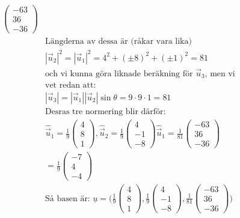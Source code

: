 \begin{multicols}{2}
\begin{align*}
  \begin{pmatrix} -63 \\ 36 \\ -36 \end{pmatrix} \\
  &\text{Längderna av dessa är (råkar vara lika)}  \\
  &|\vec{u}_2|^2 = |\vec{u}_1|^2 = 4^2 + {(\pm{8})}^2 + {(\pm{1})}^2 = 81 \\
  &\text{och vi kunna göra liknade beräkning för } \vec{u}_3 \text{, men vi} \\
  &\text{vet redan att:} \\
  &|\vec{u}_3| = |\vec{u}_1||\vec{u}_2|\sin{\theta}=9\cdot{}9\cdot{}1=81 \\
  &\text{Desras tre normering blir därför:} \\
  &\hat\vec{u}_1 = \frac{1}{9}\begin{pmatrix} 4 \\ 8 \\ 1 \end{pmatrix},
  \hat\vec{u}_2 = \frac{1}{9}\begin{pmatrix} 4 \\ -1 \\ -8 \end{pmatrix}
  \hat\vec{u}_1 = \frac{1}{81}\begin{pmatrix} -63 \\ 36 \\ -36 \end{pmatrix} \\
  &=\frac{1}{9}\begin{pmatrix} -7 \\ 4 \\ -4 \end{pmatrix} \\
  &\text{Så basen är: }
  \underline{u} = \Bigg(
  \frac{1}{9}\begin{pmatrix} 4 \\ 8 \\ 1 \end{pmatrix},
  \frac{1}{9}\begin{pmatrix} 4 \\ -1 \\ -8 \end{pmatrix},
  \frac{1}{81}\begin{pmatrix} -63 \\ 36 \\ -36 \end{pmatrix}
  \Bigg) \\
\end{align*}


\end{multicols}
